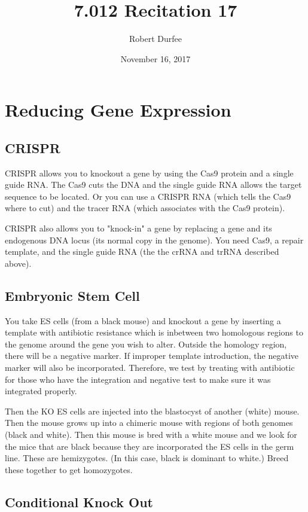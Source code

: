 \documentclass{article}
\title{ 7.012 Recitation 17 }
\author{ Robert Durfee }
\date{ November 16, 2017 }
\begin{document}
\maketitle

\section{ Reducing Gene Expression }

\subsection{CRISPR}

CRISPR allows you to knockout a gene by using the Cas9 protein and a single
guide RNA. The Cas9 cuts the DNA and the single guide RNA allows the target
sequence to be located. Or you can use a CRISPR RNA (which tells the Cas9 where
to cut) and the tracer RNA (which associates with the Cas9 protein).

CRISPR also allows you to "knock-in" a gene by replacing a gene and its
endogenous DNA locus (its normal copy in the genome). You need Cas9, a repair
template, and the single guide RNA (the the crRNA and trRNA described above).

\subsection{Embryonic Stem Cell}

You take ES cells (from a black mouse) and knockout a gene by inserting a
template with antibiotic resistance which is inbetween two homologous regions to
the genome around the gene you wish to alter. Outside the homology region, there
will be a negative marker. If improper template introduction, the negative
marker will also be incorporated. Therefore, we test by treating with antibiotic
for those who have the integration and negative test to make sure it was
integrated properly.

Then the KO ES cells are injected into the blastocyst of another (white) mouse.
Then the mouse grows up into a chimeric mouse with regions of both genomes
(black and white). Then this mouse is bred with a white mouse and we look for
the mice that are black because they are incorporated the ES cells in the germ
line. These are hemizygotes. (In this case, black is dominant to white.) Breed
these together to get homozygotes.

\subsection{Conditional Knock Out}
\end{document}

